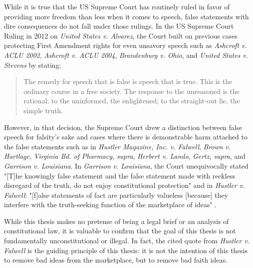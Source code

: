 \documentclass[preprint,review,12pt]{elsarticle}
\begin{document}
While it is true that the US Supreme Court has routinely ruled in favor of providing more freedom than less when it comes to speech, false statements with dire consequences do not fall under those rulings. In the US Supreme Court Ruling in 2012 on \textit{United States v. Alvarez}, the Court built on previous cases protecting First Amendment rights for even unsavory speech such as  \textit{Ashcroft v. ACLU 2002}, \textit{Ashcroft v. ACLU 2004}, \textit{Brandenburg v. Ohio}, and \textit{United States v. Stevens} by stating: 
\begin{quote}The remedy for speech that is false is speech that is true. This is the ordinary course in a free society. The response to the unreasoned is the rational; to the uninformed, the enlightened; to the straight-out lie, the simple truth.\cite{scotus2012alvarez}\end{quote} 
However, in that decision, the Supreme Court drew a distinction between false speech for falsity's sake and cases where there is demonstrable harm attached to the false statements such as in \textit{Hustler Magazine, Inc. v. Falwell}, \textit{Brown v. Hartlage}, \textit{Virginia Bd. of Pharmacy, supra}, \textit{Herbert v. Lando}, \textit{Gertz, supra}, and \textit{Garrison v. Louisiana}. In \textit{Garrison v. Louisiana}, the Court unequivocally stated "[T]he knowingly false statement and the false statement made with reckless disregard of the truth, do not enjoy constitutional protection" \cite{scotus1964garrison} and in \textit{Hustler v. Falwell}: "[f]alse statements of fact are particularly valueless [because] they interfere with the truth-seeking function of the marketplace of ideas" \cite{scotus1987hustler}. 

While this thesis makes no pretense of being a legal brief or an analysis of constitutional law, it is valuable to confirm that the goal of this thesis is not fundamentally unconstitutional or illegal. In fact, the cited quote from \textit{Hustler v. Falwell} is the guiding principle of this thesis: it is not the intention of this thesis to remove bad ideas from the marketplace, but to remove bad faith ideas.
\end{document}
